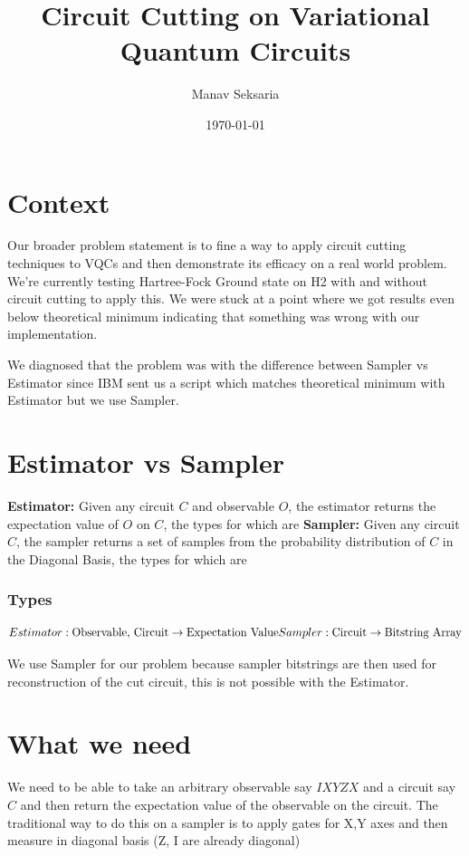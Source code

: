 \documentclass[hidelinks]{book}
\title{Circuit Cutting on Variational Quantum Circuits}
\author{Manav Seksaria}
\date{\today}
\numberwithin{equation}{section}
\begin{document}
\maketitle

\pagestyle{fancy}
\fancyhead{}
\fancyfoot{}

\section{Context}\label{objective}
Our broader problem statement is to fine a way to apply circuit cutting techniques to VQCs and then demonstrate its efficacy on a real world problem. We're currently testing Hartree-Fock Ground state on H2 with and without circuit cutting to apply this. We were stuck at a point where we got results even below theoretical minimum indicating that something was wrong with our implementation.

We diagnosed that the problem was with the difference between Sampler vs Estimator since IBM sent us a script which matches theoretical minimum with Estimator but we use Sampler.

\section{Estimator vs Sampler}\label{}
\textbf{Estimator:} Given any circuit $C$ and observable $O$, the estimator returns the expectation value of $O$ on $C$, the types for which are
\textbf{Sampler:} Given any circuit $C$, the sampler returns a set of samples from the probability distribution of $C$ in the Diagonal Basis, the types for which are

\subsubsection{Types}
\begin{equation}
  Estimator: \text{Observable, Circuit} \rightarrow \text{Expectation Value} \\
  Sampler: \text{Circuit} \rightarrow \text{Bitstring Array}
\end{equation}

We use Sampler for our problem because sampler bitstrings are then used for reconstruction of the cut circuit, this is not possible with the Estimator.

\section{What we need}\label{}
We need to be able to take an arbitrary observable say $IXYZX$ and a circuit say $C$ and then return the expectation value of the observable on the circuit. The traditional way to do this on a sampler is to apply gates for X,Y axes and then measure in diagonal basis (Z, I are already diagonal)
\end{document}
